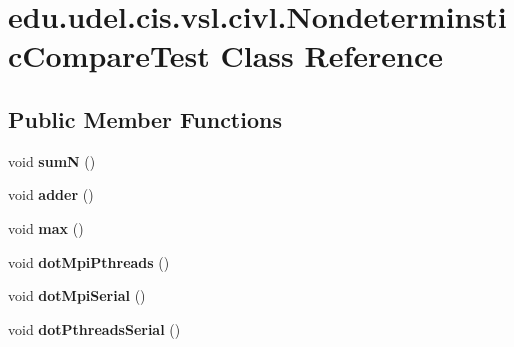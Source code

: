 \hypertarget{classedu_1_1udel_1_1cis_1_1vsl_1_1civl_1_1NondeterminsticCompareTest}{}\section{edu.\+udel.\+cis.\+vsl.\+civl.\+Nondeterminstic\+Compare\+Test Class Reference}
\label{classedu_1_1udel_1_1cis_1_1vsl_1_1civl_1_1NondeterminsticCompareTest}
\subsection*{Public Member Functions}
\begin{DoxyCompactItemize}
\item 
\hypertarget{classedu_1_1udel_1_1cis_1_1vsl_1_1civl_1_1NondeterminsticCompareTest_a639372c3a1521dcf07ce0045c55beef3}{}void {\bfseries sum\+N} ()\label{classedu_1_1udel_1_1cis_1_1vsl_1_1civl_1_1NondeterminsticCompareTest_a639372c3a1521dcf07ce0045c55beef3}

\item 
\hypertarget{classedu_1_1udel_1_1cis_1_1vsl_1_1civl_1_1NondeterminsticCompareTest_a75c05d0375cb16f57e245f417511928d}{}void {\bfseries adder} ()\label{classedu_1_1udel_1_1cis_1_1vsl_1_1civl_1_1NondeterminsticCompareTest_a75c05d0375cb16f57e245f417511928d}

\item 
\hypertarget{classedu_1_1udel_1_1cis_1_1vsl_1_1civl_1_1NondeterminsticCompareTest_a426d59ba92719d80b6a4f9dc472e1b2e}{}void {\bfseries max} ()\label{classedu_1_1udel_1_1cis_1_1vsl_1_1civl_1_1NondeterminsticCompareTest_a426d59ba92719d80b6a4f9dc472e1b2e}

\item 
\hypertarget{classedu_1_1udel_1_1cis_1_1vsl_1_1civl_1_1NondeterminsticCompareTest_a26929f54f4cd5fe07d57937f3b8168d0}{}void {\bfseries dot\+Mpi\+Pthreads} ()\label{classedu_1_1udel_1_1cis_1_1vsl_1_1civl_1_1NondeterminsticCompareTest_a26929f54f4cd5fe07d57937f3b8168d0}

\item 
\hypertarget{classedu_1_1udel_1_1cis_1_1vsl_1_1civl_1_1NondeterminsticCompareTest_a0dfe5e217a0360a93d50ae7cf3581270}{}void {\bfseries dot\+Mpi\+Serial} ()\label{classedu_1_1udel_1_1cis_1_1vsl_1_1civl_1_1NondeterminsticCompareTest_a0dfe5e217a0360a93d50ae7cf3581270}

\item 
\hypertarget{classedu_1_1udel_1_1cis_1_1vsl_1_1civl_1_1NondeterminsticCompareTest_a3bb228e9521d94b795f8f72772b08104}{}void {\bfseries dot\+Pthreads\+Serial} ()\label{classedu_1_1udel_1_1cis_1_1vsl_1_1civl_1_1NondeterminsticCompareTest_a3bb228e9521d94b795f8f72772b08104}


\end{DoxyCompactItemize}
